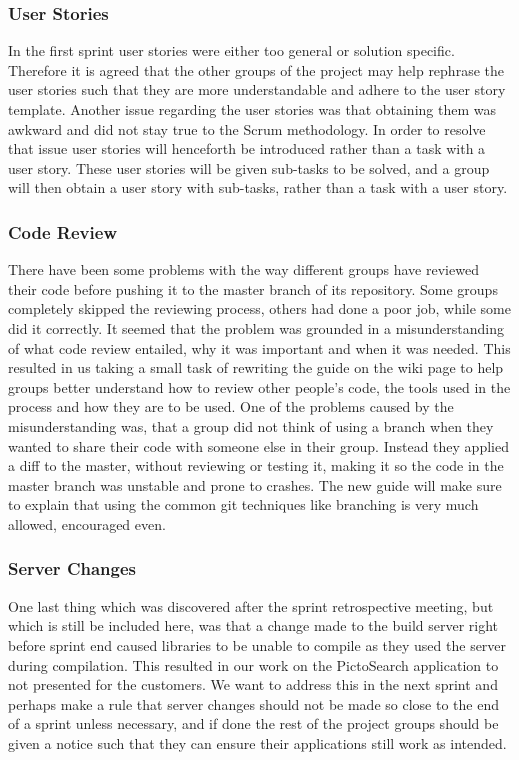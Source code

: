 \subsubsection{User Stories} 
In the first sprint user stories were either too general or solution specific.
Therefore it is agreed that the other groups of the project may help rephrase the user stories such that they are more understandable and adhere to the user story template.
Another issue regarding the user stories was that obtaining them was awkward and did not stay true to the Scrum methodology.
In order to resolve that issue user stories will henceforth be introduced rather than a task with a user story.
These user stories will be given sub-tasks to be solved, and a group will then obtain a user story with sub-tasks, rather than a task with a user story.

\subsubsection{Code Review}
There have been some problems with the way different groups have reviewed their code before pushing it to the master branch of its repository.
Some groups completely skipped the reviewing process, others had done a poor job, while some did it correctly.
It seemed that the problem was grounded in a misunderstanding of what code review entailed, why it was important and when it was needed.
This resulted in us taking a small task of rewriting the guide on the wiki page to help groups better understand how to review other people's code, the tools used in the process and how they are to be used.
One of the problems caused by the misunderstanding was, that a group did not think of using a branch when they wanted to share their code with someone else in their group.
Instead they applied a diff to the master, without reviewing or testing it, making it so the code in the master branch was unstable and prone to crashes.
The new guide will make sure to explain that using the common git techniques like branching is very much allowed, encouraged even.

\subsubsection{Server Changes}
One last thing which was discovered after the sprint retrospective meeting, but which is still be included here, was that a change made to the build server right before sprint end caused libraries to be unable to compile as they used the server during compilation.
This resulted in our work on the PictoSearch application to not presented for the customers.
We want to address this in the next sprint and perhaps make a rule that server changes should not be made so close to the end of a sprint unless necessary, and if done the rest of the project groups should be given a notice such that they can ensure their applications still work as intended.

